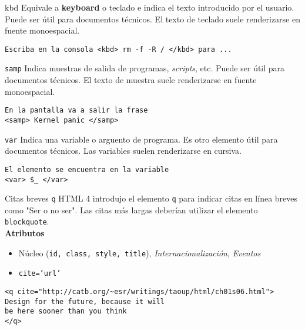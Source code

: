 \begin{frame}[fragile]{kbd} %
    Equivale a \textbf{keyboard} o teclado e indica el texto introducido por el
    usuario. Puede ser útil para documentos técnicos. El texto de teclado suele
    renderizarse en fuente monoespacial. 

\begin{lstlisting}
Escriba en la consola <kbd> rm -f -R / </kbd> para ...
\end{lstlisting}
\end{frame}

\begin{frame}[fragile]{\texttt{samp}} %
    Indica muestras de salida de programas, \textit{scripts}, etc. Puede ser
    útil para documentos técnicos. El texto de muestra suele renderizarse en
    fuente monoespacial. 
\begin{lstlisting}
En la pantalla va a salir la frase 
<samp> Kernel panic </samp>
\end{lstlisting}
\end{frame}

\begin{frame}[fragile]{\texttt{var}} %
    Indica una variable o arguento de programa. Es otro elemento útil para
    documentos técnicos. Las variables suelen renderizarse en cursiva. 
\begin{lstlisting}
El elemento se encuentra en la variable 
<var> $_ </var>
\end{lstlisting}
\end{frame}

\begin{frame}[fragile]{Citas breves \texttt{q}} %
    HTML 4 introdujo el elemento \texttt{q} para indicar citas en línea breves
    como "Ser o no ser". Las citas más largas deberían utilizar el elemento
    \texttt{blockquote}. \\[0.5cm]

    \textbf{Atributos} 
    \begin{itemize}
        \item Núcleo (\texttt{id, class, style, title}),
        \textit{Internacionalización},  \textit{Eventos}
        \item \texttt{cite='url'}
    \end{itemize}

\begin{lstlisting}
<q cite="http://catb.org/~esr/writings/taoup/html/ch01s06.html"> 
Design for the future, because it will
be here sooner than you think
</q>
\end{lstlisting}
\end{frame}    

